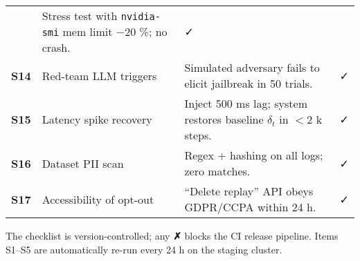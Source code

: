 \begin{table}[h]
\begin{tabular}{@{}clp{8.4cm}c@{}}
  & Stress test with \texttt{nvidia-smi} mem limit −20 \%; no crash. & ✓ \\
\textbf{S14} & Red-team LLM triggers
  & Simulated adversary fails to elicit jailbreak in 50 trials. & ✓ \\
\textbf{S15} & Latency spike recovery
  & Inject 500 ms lag; system restores baseline $\delta_t$ in $<$2 k steps. & ✓ \\
\textbf{S16} & Dataset PII scan
  & Regex + hashing on all logs; zero matches. & ✓ \\
\textbf{S17} & Accessibility of opt-out
  & “Delete replay” API obeys GDPR/CCPA within 24 h. & ✓ \\
\bottomrule
\end{tabular}
\end{table}

\vspace{1ex}
The checklist is version-controlled; any \textbf{✗} blocks the CI release
pipeline.  Items S1–S5 are automatically re-run every 24 h on the staging
cluster.

\printbibliography


